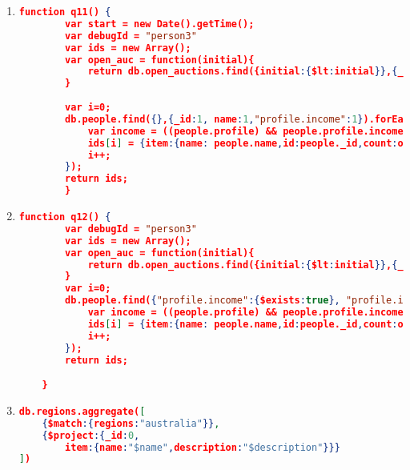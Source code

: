 \begin{enumerate}[label=Q\arabic*]
\begin{lstlisting}[language=JSON,   basicstyle=\scriptsize]
    			})
    		return prof;
    		};
        
        var ids = new Array();
    	var i = 0;
    	var allcategories = new Array();
    	db.people.aggregate([
    	{$match:{"profile.interest":{$exists:true}}},
    	{$project:{_id:1, interest:"$profile.interest"}},
    	{$unwind:"$interest"},
    	{$group:{_id:"$interest.category"}},
    	{$project:{_id:0, category:"$_id"}}
    	],{allowDiskUse:true}).forEach(function(people){
    		var catId = people.category;
    		ids[i] = {categorie:{id:catId,profile:getProfileByCategory(catId)}}
    		i++;
    	});
    	return ids;
    
    }
	\end{lstlisting}
	
	
    \item \label{mongodb-q-11}%
	\begin{lstlisting}[language=JSON,   basicstyle=\scriptsize]
	  function q11() {
    	var start = new Date().getTime();
    	var debugId = "person3"
    	var ids = new Array();
    	var open_auc = function(initial){
    		return db.open_auctions.find({initial:{$lt:initial}},{_id:1}).count();
    	}
    	
    	var i=0;
    	db.people.find({},{_id:1, name:1,"profile.income":1}).forEach(function(people){
    		var income = ((people.profile) && people.profile.income)? people.profile.income/5000:0;
    		ids[i] = {item:{name: people.name,id:people._id,count:open_auc(income)}};
    		i++;
    	});
    	return ids;
        }
	\end{lstlisting}
	
	
    \item \label{mongodb-q-12}%
	\begin{lstlisting}[language=JSON,   basicstyle=\scriptsize]
	   function q12() {
    	var debugId = "person3"
    	var ids = new Array();
    	var open_auc = function(initial){
    		return db.open_auctions.find({initial:{$lt:initial}},{_id:1}).count();
    	}
    	var i=0;
    	db.people.find({"profile.income":{$exists:true}, "profile.income":{$gt:50000}},{_id:1, name:1,"profile.income":1}).forEach(function(people){
    		var income = ((people.profile) && people.profile.income)? people.profile.income/5000:0;
    		ids[i] = {item:{name: people.name,id:people._id,count:open_auc(income)}};
    		i++;
    	});
    	return ids;

    }
	\end{lstlisting}
	
	\item \label{mongodb-q-13}%
	\begin{lstlisting}[language=JSON,   basicstyle=\scriptsize]
    db.regions.aggregate([
	{$match:{regions:"australia"}},
	{$project:{_id:0,
	    item:{name:"$name",description:"$description"}}}
])
	\end{lstlisting}
	

\end{enumerate}
